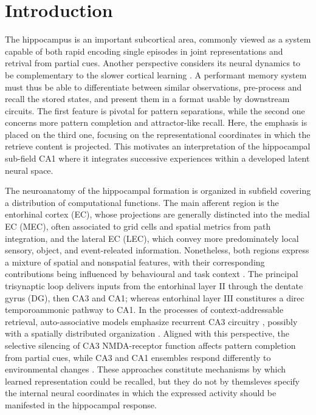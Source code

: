 \section{Introduction}

The hippocampus is an important subcortical area, commonly viewed as a system capable of both rapid encoding single episodes in joint representations and retrival from partial cues.
Another perspective considers its neural dynamics to be complementary to the slower cortical learning \cite{teyler1986, mcclelland1995}.
A performant memory system must thus be able to differentiate between similar observations, pre-process and recall the stored states, and present them in a format usable by downstream circuits.
The first feature is pivotal for pattern separations, while the second one concerns more pattern completion and attractor-like recall.
Here, the emphasis is placed on the third one, focusing on the representational coordinates in which the retrieve content is projected.
This motivates an interpretation of the hippocampal sub-field CA1 where it integrates successive experiences within a developed latent neural space.

The neuroanatomy of the hippocampal formation is organized in subfield covering a distribution of computational functions.
The main afferent region is the entorhinal cortex (EC), whose projections are generally distincted into the medial EC (MEC), often associated to grid cells and spatial metrics from path integration, and the lateral EC (LEC), which convey more predominately local sensory, object, and event-releated
information.
Nonetheless, both regions express a mixture of spatial and nonspatial features, with their corresponding contributions being influenced by behavioural and task context \cite{hargreaves2005, henriksen2010, deshmukh2011}.
The principal trisynaptic loop delivers inputs from the entorhinal layer II through the dentate gyrus (DG), then CA3 and CA1; whereas entorhinal layer III constitures a direc temporoammonic pathway to CA1.
In the processes of context-addressable retrieval, auto-associative models emphasize recurrent CA3 circuitry \cite{marr1971}, possibly with a spatially distributed organization \cite{li2024, chandra2025}.
Aligned with this perspective, the selective silencing of CA3 NMDA-receptor function affects pattern completion from partial cues, while CA3 and CA1 ensembles respond differently to environmental changes \cite{nakazawa2002,leutgeb2004}.
These approaches constitute mechanisms by which learned representation could be recalled, but they do not by themsleves specify the internal neural coordinates in which the expressed activity should be manifested in the hippocampal response.

